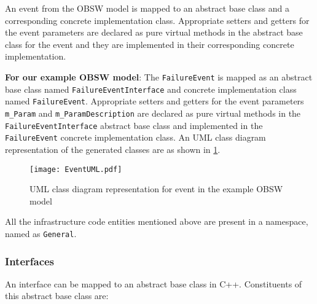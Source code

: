 An event from the OBSW model is mapped to an abstract base class and a corresponding concrete implementation class. Appropriate setters and getters for the event parameters are declared as pure virtual methods in the abstract base class for the event and they are implemented in their corresponding concrete implementation.

\textbf{For our example OBSW model}: The \texttt{FailureEvent} is mapped as an abstract base class named \texttt{FailureEvent\allowbreak Interface} and concrete implementation class named \texttt{FailureEvent}. Appropriate setters and getters for the event parameters \texttt{m\_Param} and \texttt{m\_ParamDescription} are declared as pure virtual methods in the \texttt{FailureEvent\allowbreak Interface} abstract base class and implemented in the \texttt{FailureEvent} concrete implementation class. An UML class diagram representation of the generated classes are as shown in \cref{fig: EventUML}.

\begin{figure}[h]
	\centering
	\texttt{[image: EventUML.pdf]}
	\caption{UML class diagram representation for event in the example OBSW model}
	\label{fig: EventUML}
\end{figure}    

All the infrastructure code entities mentioned above are present in a namespace, named as \texttt{General}.  

\subsubsection{\textbf{Interfaces}}
An interface can be mapped to an abstract base class in C++. Constituents of this abstract base class are:

